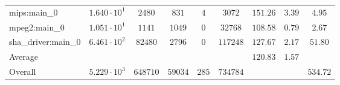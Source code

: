 \begin{tabular}{|l|c|c|c|c|c|c|c|c|}
mips:main\_0            & $ 1.640 \cdot 10^{1}  $ & $ 2480   $ & $ 831   $ & $ 4   $ & $ 3072   $ & $ 151.26      $ & $ 3.39    $ & $ 4.95    $ \\
mpeg2:main\_0           & $ 1.051 \cdot 10^{1}  $ & $ 1141   $ & $ 1049  $ & $ 0   $ & $ 32768  $ & $ 108.58      $ & $ 0.79    $ & $ 2.67    $ \\
sha\_driver:main\_0     & $ 6.461 \cdot 10^{2}  $ & $ 82480  $ & $ 2796  $ & $ 0   $ & $ 117248 $ & $ 127.67      $ & $ 2.17    $ & $ 51.80   $ \\
\hline
Average                 & $                     $ & $        $ & $       $ & $     $ & $        $ & $ 120.83      $ & $ 1.57    $ & $         $ \\
\hline
Overall                 & $ 5.229 \cdot 10^{3}  $ & $ 648710 $ & $ 59034 $ & $ 285 $ & $ 734784 $ & $             $ & $         $ & $ 534.72  $ \\
\hline
\end{tabular}
